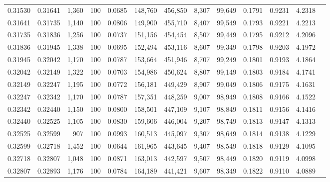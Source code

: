 \begin{tabular}{rrrrrrrrrrrrr}
0.31530 & 0.31641 & 1,360 & 100 &                                     0.0685 & 148,760 & 456,850 &   8,307 &  99,649 & 0.1791 & 0.9231 & 4.2318 \\
0.31641 & 0.31735 & 1,140 & 100 &                                     0.0806 & 149,900 & 455,710 &   8,407 &  99,549 & 0.1793 & 0.9221 & 4.2213 \\
0.31735 & 0.31836 & 1,256 & 100 &                                     0.0737 & 151,156 & 454,454 &   8,507 &  99,449 & 0.1795 & 0.9212 & 4.2096 \\
0.31836 & 0.31945 & 1,338 & 100 &                                     0.0695 & 152,494 & 453,116 &   8,607 &  99,349 & 0.1798 & 0.9203 & 4.1972 \\
0.31945 & 0.32042 & 1,170 & 100 &                                     0.0787 & 153,664 & 451,946 &   8,707 &  99,249 & 0.1801 & 0.9193 & 4.1864 \\
0.32042 & 0.32149 & 1,322 & 100 &                                     0.0703 & 154,986 & 450,624 &   8,807 &  99,149 & 0.1803 & 0.9184 & 4.1741 \\
0.32149 & 0.32247 & 1,195 & 100 &                                     0.0772 & 156,181 & 449,429 &   8,907 &  99,049 & 0.1806 & 0.9175 & 4.1631 \\
0.32247 & 0.32342 & 1,170 & 100 &                                     0.0787 & 157,351 & 448,259 &   9,007 &  98,949 & 0.1808 & 0.9166 & 4.1522 \\
0.32342 & 0.32440 & 1,150 & 100 &                                     0.0800 & 158,501 & 447,109 &   9,107 &  98,849 & 0.1811 & 0.9156 & 4.1416 \\
0.32440 & 0.32525 & 1,105 & 100 &                                     0.0830 & 159,606 & 446,004 &   9,207 &  98,749 & 0.1813 & 0.9147 & 4.1313 \\
0.32525 & 0.32599 &   907 & 100 &                                     0.0993 & 160,513 & 445,097 &   9,307 &  98,649 & 0.1814 & 0.9138 & 4.1229 \\
0.32599 & 0.32718 & 1,452 & 100 &                                     0.0644 & 161,965 & 443,645 &   9,407 &  98,549 & 0.1818 & 0.9129 & 4.1095 \\
0.32718 & 0.32807 & 1,048 & 100 &                                     0.0871 & 163,013 & 442,597 &   9,507 &  98,449 & 0.1820 & 0.9119 & 4.0998 \\
0.32807 & 0.32893 & 1,176 & 100 &                                     0.0784 & 164,189 & 441,421 &   9,607 &  98,349 & 0.1822 & 0.9110 & 4.0889 \\

\end{tabular}
